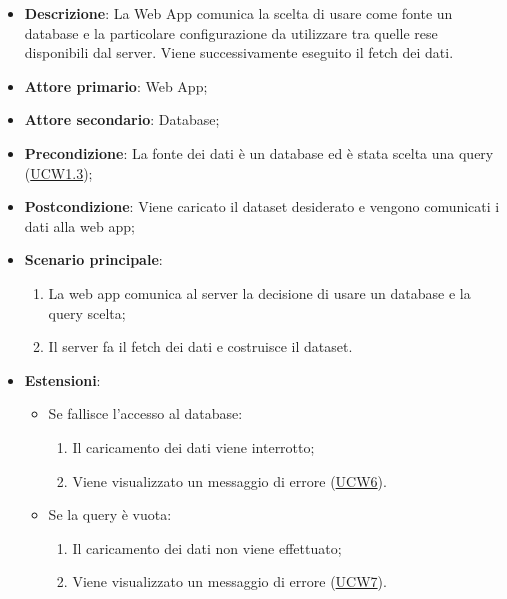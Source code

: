\begin{itemize}

	\item \textbf{Descrizione}: La Web App comunica la scelta di usare come fonte un database e la particolare configurazione da utilizzare tra quelle
	      rese disponibili dal server. Viene successivamente eseguito il fetch dei dati.

	\item \textbf{Attore primario}: Web App;
	\item \textbf{Attore secondario}: Database;

	\item \textbf{Precondizione}:   La fonte dei dati è un database ed è stata scelta una query (\hyperref[ssub:ucw1.3]{UCW1.3});

	\item \textbf{Postcondizione}:  Viene caricato il dataset desiderato e vengono comunicati i dati alla web app;

	\item \textbf{Scenario principale}:
	      \begin{enumerate}
		      \item La web app comunica al server la decisione di usare un database e la query scelta;
		      \item Il server fa il fetch dei dati e costruisce il dataset.
	      \end{enumerate}

	\item \textbf{Estensioni}:
	      \begin{itemize}

		      \item Se fallisce l'accesso al database:
		            \begin{enumerate}

			            \item Il caricamento dei dati viene interrotto;
			            \item Viene visualizzato un messaggio di errore (\hyperref[sub:ucw6]{UCW6}).

		            \end{enumerate}

		      \item Se la query è vuota:
		            \begin{enumerate}

			            \item Il caricamento dei dati non viene effettuato;
			            \item Viene visualizzato un messaggio di errore (\hyperref[sub:ucw7]{UCW7}).

		            \end{enumerate}

	      \end{itemize}

\end{itemize}